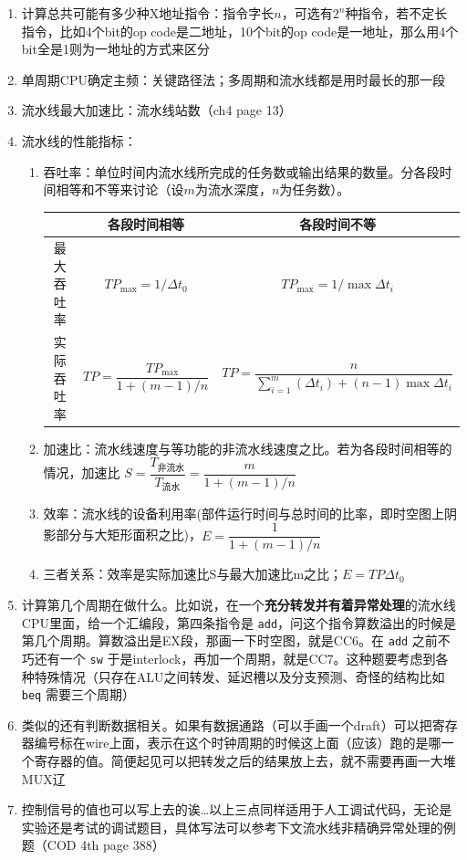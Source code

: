 \documentclass[]{report}
\begin{document}
\begin{enumerate}[label = \textsf{\arabic{*}}]
		\item 计算总共可能有多少种X地址指令：指令字长$n$，可选有$2^n$种指令，若不定长指令，比如4个bit的op code是二地址，10个bit的op code是一地址，那么用4个bit全是1则为一地址的方式来区分
		\item 单周期CPU确定主频：关键路径法；多周期和流水线都是用时最长的那一段
		\item 流水线最大加速比：流水线站数（ch4 page 13）
		\item 流水线的性能指标：
		\begin{enumerate}
			\item 吞吐率：单位时间内流水线所完成的任务数或输出结果的数量。分各段时间相等和不等来讨论（设$m$为流水深度，$n$为任务数）。
			\begin{table}[h]
				\centering
				\begin{tabular}{ccc}
					\toprule
					&各段时间相等&各段时间不等\\
					\midrule
					最大吞吐率 & $TP_{\max}=1/{\Delta t_0}$ & $TP_{\max}=1/\max{\Delta t_i}$\\
					实际吞吐率 & $TP=\dfrac{TP_{\max}}{1+(m-1)/n}$ & $TP=\dfrac{n}{\sum_{i=1}^m(\Delta t_i)+(n-1)\max\Delta t_i }$\\
					\bottomrule
				\end{tabular}
			\end{table}
			\item 加速比：流水线速度与等功能的非流水线速度之比。若为各段时间相等的情况，加速比 $S=\dfrac{T_{\mbox{非流水}}}{T_{\mbox{流水}}}=\dfrac{m}{1+(m-1)/n}$
			\item 效率：流水线的设备利用率(部件运行时间与总时间的比率，即时空图上阴影部分与大矩形面积之比)，$E=\dfrac{1}{1+(m-1)/n}$
			\item 三者关系：效率是实际加速比S与最大加速比m之比；$E=TP\Delta t_0$
		\end{enumerate}
		\item 计算第几个周期在做什么。比如说，在一个\textbf{充分转发并有着异常处理}的流水线CPU里面，给一个汇编段，第四条指令是 \verb|add|，问这个指令算数溢出的时候是第几个周期。算数溢出是EX段，那画一下时空图，就是CC6。在 \verb|add| 之前不巧还有一个 \verb|sw| 于是interlock，再加一个周期，就是CC7。这种题要考虑到各种特殊情况（只存在ALU之间转发、延迟槽以及分支预测、奇怪的结构比如 \verb|beq| 需要三个周期）
		\item 类似的还有判断数据相关。如果有数据通路（可以手画一个draft）可以把寄存器编号标在wire上面，表示在这个时钟周期的时候这上面（应该）跑的是哪一个寄存器的值。简便起见可以把转发之后的结果放上去，就不需要再画一大堆MUX辽
		\item 控制信号的值也可以写上去的诶\dots 以上三点同样适用于人工调试代码，无论是实验还是考试的调试题目，具体写法可以参考下文流水线非精确异常处理的例题（COD 4th page 388）

\end{enumerate}
\end{document}
